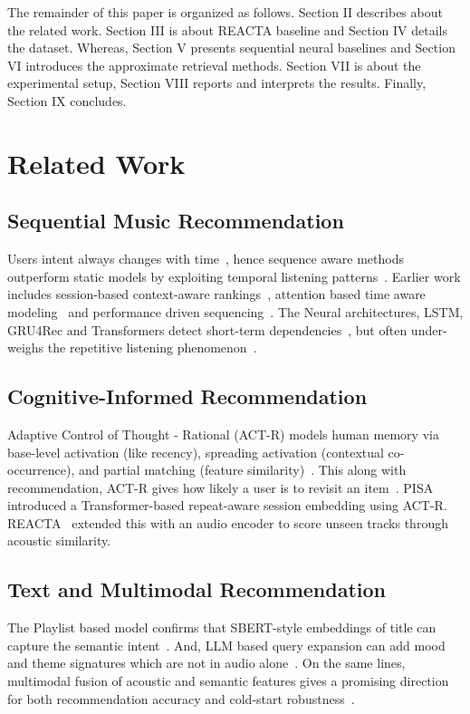 \documentclass[conference]{IEEEtran}
\begin{document}
The remainder of this paper is organized as follows. Section II describes
about the related work. Section III is about REACTA baseline and Section IV
details the dataset. Whereas, Section V presents sequential neural baselines
and Section VI introduces the approximate retrieval methods. Section VII is
about the experimental setup, Section VIII reports and interprets the results.
Finally, Section IX concludes.

\section{Related Work}

\subsection{Sequential Music Recommendation}
Users intent always changes with time~\cite{fang2020}, hence sequence aware
methods outperform static models by exploiting temporal listening
patterns~\cite{dongjing2018,dongjing2021,hansen2020}. Earlier work includes
session-based context-aware rankings~\cite{bendada2023}, attention based time
aware modeling~\cite{tran2023} and performance driven sequencing~\cite{moor2023}.
The Neural architectures, LSTM, GRU4Rec and Transformers detect short-term
dependencies~\cite{fang2020,vaswani2017}, but often under-weighs the
repetitive listening phenomenon~\cite{reiter2021,moscati2023}.

\subsection{Cognitive-Informed Recommendation}
Adaptive Control of Thought - Rational (ACT-R) models human memory via
base-level activation (like recency), spreading activation (contextual
co-occurrence), and partial matching (feature similarity)~\cite{anderson2004,
bothell2020}. This along with recommendation, ACT-R gives how likely a user is
to revisit an item~\cite{reiter2021,moscati2023}. PISA~\cite{tran2024pisa}
introduced a Transformer-based repeat-aware session embedding using ACT-R.
REACTA~\cite{tran2025reacta} extended this with an audio encoder to score
unseen tracks through acoustic similarity.

\subsection{Text and Multimodal Recommendation}
The Playlist based model confirms that SBERT-style embeddings of title can
capture the semantic intent~\cite{charolois2025}. And, LLM based query
expansion can add mood and theme signatures which are not in audio
alone~\cite{hagio2025}. On the same lines, multimodal fusion of acoustic and
semantic features gives a promising direction for both recommendation accuracy
and cold-start robustness~\cite{charolois2025,hagio2025}.
\end{document}
